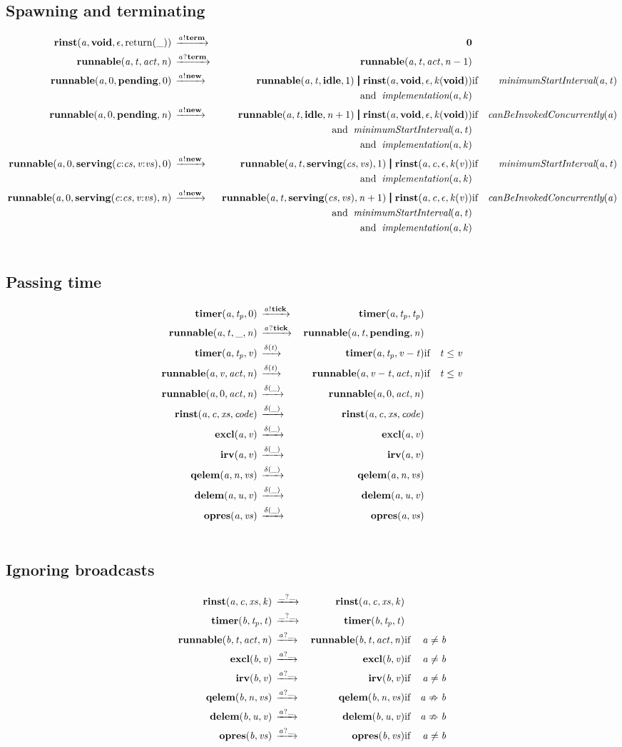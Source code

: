 \documentclass[twocolumn]{article}
\begin{document}
\subsection{Spawning and terminating}
\begin{eqnarray}      \SpawnTerminate          \notag \end{eqnarray}

\subsection{Passing time}
\begin{eqnarray}      \PassingTime             \notag \end{eqnarray}

\subsection{Ignoring broadcasts}
\begin{eqnarray}      \IgnoreBroadcast         \notag \end{eqnarray}
\end{document}
